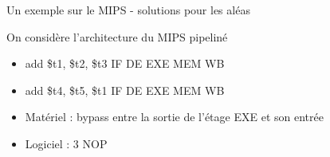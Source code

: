 %
\begin{Frame}{Un exemple sur le MIPS - solutions pour les aléas}

\begin{block}{On considère l'architecture du MIPS pipeliné}
       \begin{center}
 	\begin{itemize}
	\item add \$t1, \$t2, \$t3  \hspace*{0,3cm} IF \hspace*{0,3cm} DE \hspace*{0,3cm} EXE \hspace*{0,3cm} MEM \hspace*{0,3cm} WB
	\item add \$t4, \$t5, \$t1  \hspace*{1,2cm} IF \hspace*{0,45cm} DE \hspace*{0,5cm}  EXE      \hspace*{0,4cm} MEM \hspace*{0,4cm} WB
	\item Matériel : bypass entre la sortie de l'étage EXE et son entrée
	\item Logiciel : 3 NOP
        \end{itemize}
       \end{center}
      \end{block}   
 

\vspace{-0.1cm}
        \begin{center}
        \end{center}
      
\end{Frame}


